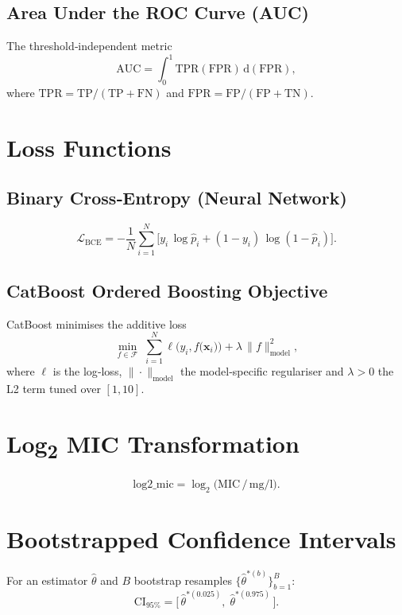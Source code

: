 \documentclass[12pt]{article}
\begin{document}
\subsection{Area Under the ROC Curve (AUC)}
The threshold‑independent metric
\begin{equation}
 \text{AUC} = \int_{0}^{1} \text{TPR}(\text{FPR})\,\mathrm d(\text{FPR}),
\end{equation}
where $\text{TPR}=\mathrm{TP}/(\mathrm{TP}+\mathrm{FN})$ and $\text{FPR}=\mathrm{FP}/(\mathrm{FP}+\mathrm{TN})$.

\section{Loss Functions}
\subsection{Binary Cross‑Entropy (Neural Network)}
\begin{equation}
  \mathcal{L}_{\text{BCE}} = -\frac{1}{N}\sum_{i=1}^{N}\bigl[y_i\,\log \hat{p}_i + (1-y_i)\,\log(1-\hat{p}_i)\bigr].
\end{equation}

\subsection{CatBoost Ordered Boosting Objective}
CatBoost minimises the additive loss
\begin{equation}
  \min_{f \in \mathcal{F}} \; \sum_{i=1}^{N} \ell\bigl(y_i, f\bigl(\bm{x}_i\bigr)\bigr) + \lambda\,\|f\|_{\text{model}}^{2},
\end{equation}
where $\ell$ is the log‑loss, $\|\cdot\|_{\text{model}}$ the model‑specific regulariser and $\lambda>0$ the L2 term tuned over $[1,10]$.

\section{Log\textsubscript{2} MIC Transformation}
\begin{equation}
  \mathrm{log2\_mic} = \log_{2}\bigl(\text{MIC}\,/\,\si{\milli\gram\per\litre}\bigr).
\end{equation}

\section{Bootstrapped Confidence Intervals}
For an estimator $\hat{\theta}$ and $B$ bootstrap resamples $\{\hat{\theta}^{*(b)}\}_{b=1}^{B}$:
\begin{equation}
  \text{CI}_{95\%} = \bigl[\,\hat{\theta}^{*(0.025)},\;\hat{\theta}^{*(0.975)}\,\bigr].
\end{equation}
\end{document}

